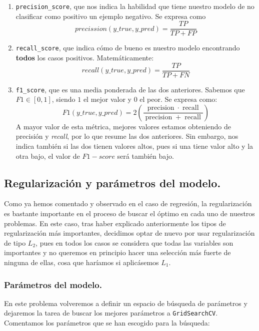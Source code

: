 \documentclass[a4paper, 20pt]{article}
\begin{document}
\begin{enumerate}
  \item \lstinline{precision_score}, que nos indica la habilidad que tiene nuestro modelo de no clasificar como positivo un ejemplo negativo. Se expresa como
  $$
  precission(y\_true,y\_pred) = \frac{TP}{TP + FP}
  $$
  \item \lstinline{recall_score}, que indica cómo de bueno es nuestro modelo encontrando \textbf{todos} los casos positivos. Matemáticamente:
  \[
    recall(y\_true,y\_pred) = \frac{TP}{TP + FN} 
  \]
  \item \lstinline{f1_score}, que es una media ponderada de las dos anteriores. Sabemos que $F1 \in [0,1]$, siendo $1$ el mejor valor y $0$ el peor. Se expresa como:
  \[
  F1(y\_true,y\_pred) = 2 \left(\frac{ \operatorname{precision}\cdot \operatorname{recall} }{ \operatorname{precision} + \operatorname{recall} }\right)
  \]
  A mayor valor de esta métrica, mejores valores estamos obteniendo de precisión y \emph{recall}, por lo que resume las dos anteriores. Sin embargo, nos indica también si las dos tienen valores altos, pues si una tiene valor alto y la otra bajo, el valor de $F1-score$ será también bajo.
\end{enumerate}

\subsection{Regularización y parámetros del modelo.}

Como ya hemos comentado y observado en el caso de regresión, la regularización es bastante importante en el proceso de buscar el óptimo en cada uno de nuestros problemas. En este caso, tras haber explicado anteriormente los tipos de regularización más importantes, decidimos optar de nuevo por usar regularización de tipo $L_2$, pues en todos los casos se considera que todas las variables son importantes y no queremos en principio hacer una selección más fuerte de ninguna de ellas, cosa que haríamos si aplicásemos $L_1$.

\subsubsection{Parámetros del modelo.}

En este problema volveremos a definir un espacio de búsqueda de parámetros y dejaremos la tarea de buscar los mejores parámetros a \lstinline{GridSearchCV}. Comentamos los parámetros que se han escogido para la búsqueda:
\end{document}
